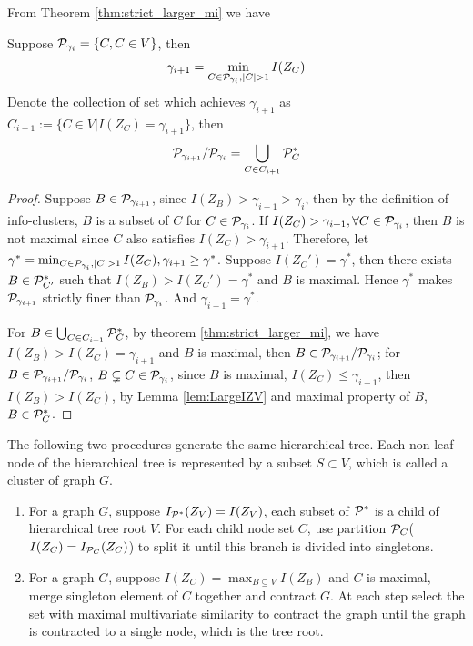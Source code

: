 \documentclass{article}
\begin{document}
From Theorem \ref{thm:strict_larger_mi} we have 
\begin{theorem}
Suppose $\P_{\gamma_i} = \{C, C\in V \}$, then
\begin{equation}
\gamma_{i+1} = \displaystyle\min_{C\in \P_{\gamma_i}, \abs{C}>1} I(Z_C) 
\end{equation}
Denote the collection of set which achieves $\gamma_{i+1}$ as $C_{i+1}:=\{C \in V | I(Z_C) = \gamma_{i+1}\}$, then
\begin{equation}
\P_{\gamma_{i+1}}/\P_{\gamma_i} = \bigcup_{C \in C_{i+1}} \P_C^*
\end{equation}
\end{theorem}
\begin{proof}
	Suppose $B \in \P_{\gamma_{i+1}}$, since $I(Z_B)>\gamma_{i+1} > \gamma_i$, then by the definition of info-clusters, $B$ is a subset of $C$ for $C \in \P_{\gamma_i}$.	
	If $I(Z_C) > \gamma_{i+1}, \forall C\in \P_{\gamma_i}$, then $B$ is not maximal since $C$ also satisfies $I(Z_C) > \gamma_{i+1}$.
	Therefore, let  $\gamma^* = \min_{C \in \P_{\gamma_i}, \abs{C}>1} I(Z_C), \gamma_{i+1} \geq \gamma^*$.
	Suppose $I(Z_C')=\gamma^*$, then there exists $B\in \P^*_{C'}$ such that $I(Z_B) > I(Z_C') = \gamma^*$ and $B$ is maximal.
	Hence $\gamma^*$ makes $\P_{\gamma_{i+1}}$ strictly finer than $\P_{\gamma_i}$. And $\gamma_{i+1} = \gamma^*$.
	
	For $B \in \bigcup_{C \in C_{i+1}} \P_C^*$, by theorem \ref{thm:strict_larger_mi}, we have $I(Z_B) > I(Z_C) =  \gamma_{i+1}$ and $B$ is maximal,
	then $B \in \P_{\gamma_{i+1}}/\P_{\gamma_{i}}$;
	for $B \in \P_{\gamma_{i+1}}/\P_{\gamma_{i}}$, $B\subsetneq C \in \P_{\gamma_i}$, since $B$ is maximal, $I(Z_C) \leq \gamma_{i+1}$, 
	then $I(Z_B) > I(Z_C)$,
	by Lemma \ref{lem:LargeIZV} and maximal property of $B$, $B \in \P^*_C$.
\end{proof}
\begin{proposition}\label{prop:ta}
The following two procedures generate the same hierarchical tree. Each non-leaf node of the hierarchical tree is represented by a subset $S \subset V$, which is called a cluster of graph $G$.
\begin{enumerate}
\item For a graph $G$, suppose $I_{\P^*}(Z_V)=I(Z_V)$, each subset of $\P^*$ is a child of hierarchical tree root $V$. For each child node set $C$, use partition $\P_C$($I(Z_C)=I_{\P_C}(Z_C)$) to split it until this branch is divided into singletons.
\item For a graph $G$, suppose $I(Z_C) = \max_{B\subseteq V} I(Z_B)$ and $C$ is maximal, merge singleton element of $C$ together and contract $G$. At each step select the set with maximal multivariate similarity to contract the graph until the graph is contracted to a single node, which is the tree root.
\end{enumerate}
\end{proposition}
\end{document}
